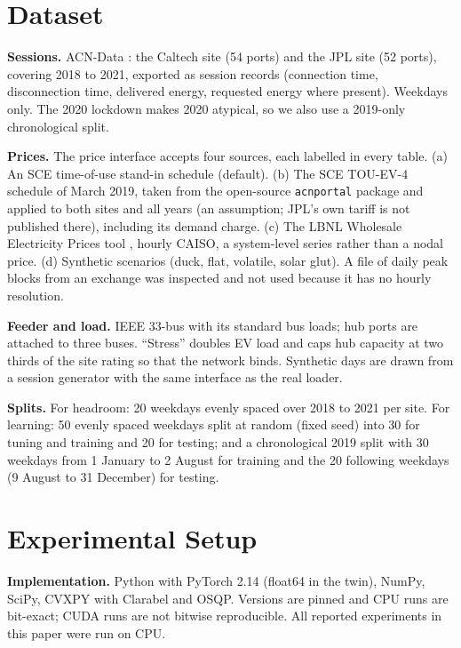 \documentclass[11pt]{article}
\begin{document}
\section{Dataset}\label{sec:data}
\textbf{Sessions.} ACN-Data \cite{acn}: the Caltech site (54 ports) and the JPL site (52 ports), covering 2018 to 2021, exported as session records (connection time, disconnection time, delivered energy, requested energy where present). Weekdays only. The 2020 lockdown makes 2020 atypical, so we also use a 2019-only chronological split.

\textbf{Prices.} The price interface accepts four sources, each labelled in every table. (a) An SCE time-of-use stand-in schedule (default). (b) The SCE TOU-EV-4 schedule of March 2019, taken from the open-source \texttt{acnportal} package and applied to both sites and all years (an assumption; JPL's own tariff is not published there), including its demand charge. (c) The LBNL Wholesale Electricity Prices tool \cite{wep}, hourly CAISO, a system-level series rather than a nodal price. (d) Synthetic scenarios (duck, flat, volatile, solar glut). A file of daily peak blocks from an exchange was inspected and not used because it has no hourly resolution.

\textbf{Feeder and load.} IEEE 33-bus \cite{baranwu} with its standard bus loads; hub ports are attached to three buses. ``Stress'' doubles EV load and caps hub capacity at two thirds of the site rating so that the network binds. Synthetic days are drawn from a session generator with the same interface as the real loader.

\textbf{Splits.} For headroom: 20 weekdays evenly spaced over 2018 to 2021 per site. For learning: 50 evenly spaced weekdays split at random (fixed seed) into 30 for tuning and training and 20 for testing; and a chronological 2019 split with 30 weekdays from 1 January to 2 August for training and the 20 following weekdays (9 August to 31 December) for testing.

\section{Experimental Setup}
\textbf{Implementation.} Python with PyTorch 2.14 (float64 in the twin), NumPy, SciPy, CVXPY with Clarabel and OSQP. Versions are pinned and CPU runs are bit-exact; CUDA runs are not bitwise reproducible. All reported experiments in this paper were run on CPU.
\end{document}
